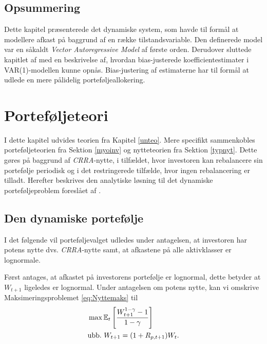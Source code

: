 \documentclass[
  a4paper,
  oneside]{memoir}
\begin{document}
\hypertarget{opsummering}{%
\section{Opsummering}\label{opsummering}}

Dette kapitel præsenterede det dynamiske system, som havde til formål at modellere afkast på baggrund af en række tilstandsvariable. Den definerede model var en såkaldt \emph{Vector Autoregressive Model} af første orden. Derudover sluttede kapitlet af med en beskrivelse af, hvordan bias-justerede koefficientestimater i VAR(1)-modellen kunne opnås. Bias-justering af estimaterne har til formål at udlede en mere pålidelig porteføljeallokering.

\hypertarget{porteteori}{%
\chapter{Porteføljeteori}\label{porteteori}}

I dette kapitel udvides teorien fra Kapitel \ref{unteo}. Mere specifikt sammenkobles porteføljeteorien fra Sektion \ref{myoinv} og nytteteorien fra Sektion \ref{typnyt}. Dette gøres på baggrund af \emph{CRRA}-nytte, i tilfældet, hvor investoren kan rebalancere sin portefølje periodisk og i det restringerede tilfælde, hvor ingen rebalancering er tilladt. Herefter beskrives den analytiske løsning til det dynamiske porteføljeproblem foreslået af \citep{JurVic2011}.

\hypertarget{crraportef}{%
\section{Den dynamiske portefølje}\label{crraportef}}

I det følgende vil porteføljevalget udledes under antagelsen, at investoren har potens nytte dvs. \emph{CRRA}-nytte samt, at afkastene på alle aktivklasser er lognormale.

Først antages, at afkastet på investorens portefølje er lognormal, dette betyder at \(W_{t+1}\) ligeledes er lognormal. Under antagelsen om potens nytte, kan vi omskrive Maksimeringsproblemet \eqref{eq:Nyttemaks} til
\begin{align}
&\max\mathbb{E}_t\left[\frac{W_{t+1}^{1-\gamma}-1}{1-\gamma}\right] \label{eq:CRRAmaks}\\
&\text{ubb.}\,\,W_{t+1}=(1+R_{p,t+1})W_t.\notag
\end{align}
\end{document}
